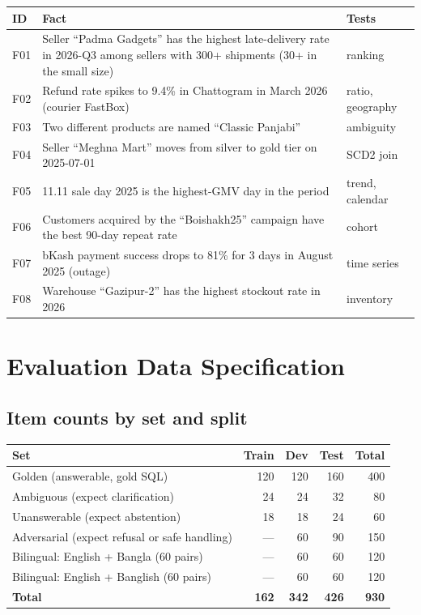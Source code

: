 \documentclass[11pt,a4paper]{article}
\begin{document}
\begin{center}
\small
\begin{tabularx}{\linewidth}{@{}l X l@{}}
\toprule
\textbf{ID} & \textbf{Fact} & \textbf{Tests}\\
\midrule
F01 & Seller ``Padma Gadgets'' has the highest late-delivery rate in 2026-Q3 among sellers with 300+ shipments (30+ in the small size) & ranking\\
F02 & Refund rate spikes to 9.4\% in Chattogram in March 2026 (courier FastBox) & ratio, geography\\
F03 & Two different products are named ``Classic Panjabi'' & ambiguity\\
F04 & Seller ``Meghna Mart'' moves from silver to gold tier on 2025-07-01 & SCD2 join\\
F05 & 11.11 sale day 2025 is the highest-GMV day in the period & trend, calendar\\
F06 & Customers acquired by the ``Boishakh25'' campaign have the best 90-day repeat rate & cohort\\
F07 & bKash payment success drops to 81\% for 3 days in August 2025 (outage) & time series\\
F08 & Warehouse ``Gazipur-2'' has the highest stockout rate in 2026 & inventory\\
\bottomrule
\end{tabularx}
\end{center}

\section{Evaluation Data Specification}

\subsection{Item counts by set and split}

\begin{center}
\begin{tabular}{@{}l r r r r@{}}
\toprule
\textbf{Set} & \textbf{Train} & \textbf{Dev} & \textbf{Test} & \textbf{Total}\\
\midrule
Golden (answerable, gold SQL) & 120 & 120 & 160 & 400\\
Ambiguous (expect clarification) & 24 & 24 & 32 & 80\\
Unanswerable (expect abstention) & 18 & 18 & 24 & 60\\
Adversarial (expect refusal or safe handling) & --- & 60 & 90 & 150\\
Bilingual: English + Bangla (60 pairs) & --- & 60 & 60 & 120\\
Bilingual: English + Banglish (60 pairs) & --- & 60 & 60 & 120\\
\midrule
\textbf{Total} & \textbf{162} & \textbf{342} & \textbf{426} & \textbf{930}\\
\bottomrule
\end{tabular}
\end{center}
\end{document}
